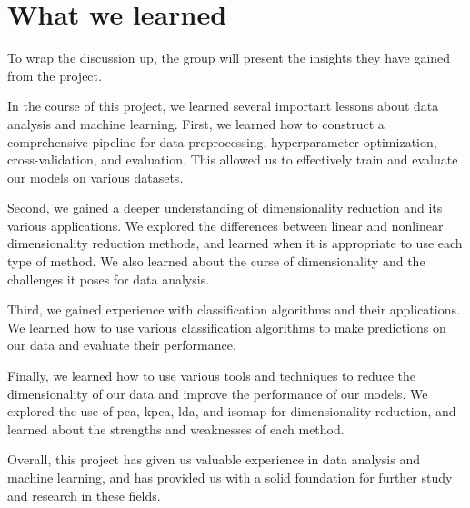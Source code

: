 \section{What we learned}\label{sec:what-we-learned}
To wrap the discussion up, the group will present the insights they have gained from the project. 


In the course of this project, we learned several important lessons about data analysis and machine learning. First, we learned how to construct a comprehensive pipeline for data preprocessing, hyperparameter optimization, cross-validation, and evaluation. This allowed us to effectively train and evaluate our models on various datasets.

Second, we gained a deeper understanding of dimensionality reduction and its various applications. We explored the differences between linear and nonlinear dimensionality reduction methods, and learned when it is appropriate to use each type of method. We also learned about the curse of dimensionality and the challenges it poses for data analysis.

Third, we gained experience with classification algorithms and their applications. We learned how to use various classification algorithms to make predictions on our data and evaluate their performance.

Finally, we learned how to use various tools and techniques to reduce the dimensionality of our data and improve the performance of our models. We explored the use of \gls{pca}, \gls{kpca}, \gls{lda}, and \gls{isomap} for dimensionality reduction, and learned about the strengths and weaknesses of each method.

Overall, this project has given us valuable experience in data analysis and machine learning, and has provided us with a solid foundation for further study and research in these fields.





